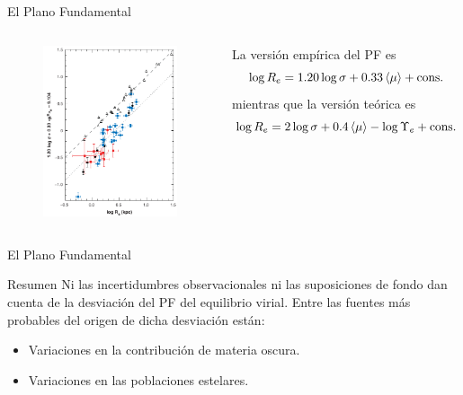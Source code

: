 \documentclass[xcolor=dvipsnames,4pt]{beamer}
\newenvironment{changemargin}[2]{%
  \begin{list}{}{%
    \setlength{\topsep}{0pt}%
    \setlength{\leftmargin}{#1}%
    \setlength{\rightmargin}{#2}%
    \setlength{\listparindent}{\parindent}%
    \setlength{\itemindent}{\parindent}%
    \setlength{\parsep}{\parskip}%
  }%
\item[]}{\end{list}}
\begin{document}
\begin{frame}{El Plano Fundamental}
\begin{changemargin}{-1cm}{-1cm}
\begin{columns}
\begin{figure}
\includegraphics[scale=0.7]{img/fp.png}
\end{figure}
La versión empírica del PF es
$$
\log{R_e} = 1.20\log{\sigma} + 0.33\left<\mu\right> + {\rm cons.}
$$
mientras que la versión teórica es
$$
\log{R_e} = 2\log{\sigma} + 0.4\left<\mu\right> - \log{\Upsilon_e} + {\rm cons}.
$$
\end{columns}
\end{changemargin}
\end{frame}

\begin{frame}{El Plano Fundamental}
\begin{block}{Resumen}
Ni las incertidumbres observacionales ni las suposiciones de fondo dan cuenta de la desviación del PF del equilibrio virial. Entre las fuentes más probables del origen de dicha desviación están:
\end{block}
\begin{itemize}
\item Variaciones en la contribución de materia oscura.
\item Variaciones en las poblaciones estelares.
\end{itemize}
\end{frame}
\end{document}
